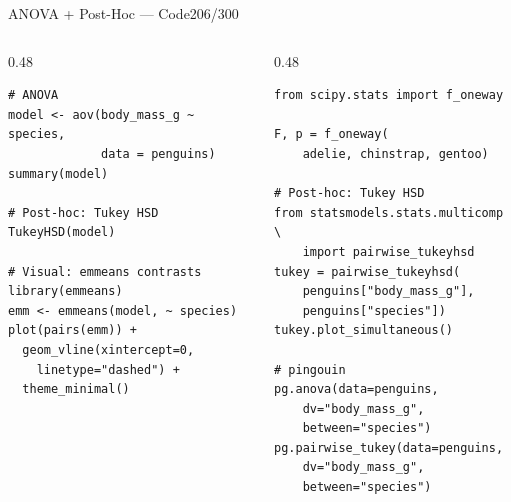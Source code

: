 \documentclass[10pt]{beamer}
\newcommand{\smark}[1]{\hfill{\scriptsize\color{codegray}#1}}
\begin{document}
\begin{frame}[fragile]{ANOVA + Post-Hoc --- Code}\smark{206/300}
\begin{columns}[T]
\begin{column}{0.48\textwidth}
\begin{lstlisting}[style=Rstyle]
# ANOVA
model <- aov(body_mass_g ~ species,
             data = penguins)
summary(model)

# Post-hoc: Tukey HSD
TukeyHSD(model)

# Visual: emmeans contrasts
library(emmeans)
emm <- emmeans(model, ~ species)
plot(pairs(emm)) +
  geom_vline(xintercept=0,
    linetype="dashed") +
  theme_minimal()
\end{lstlisting}
\end{column}
\begin{column}{0.48\textwidth}
\begin{lstlisting}[style=Pystyle]
from scipy.stats import f_oneway

F, p = f_oneway(
    adelie, chinstrap, gentoo)

# Post-hoc: Tukey HSD
from statsmodels.stats.multicomp \
    import pairwise_tukeyhsd
tukey = pairwise_tukeyhsd(
    penguins["body_mass_g"],
    penguins["species"])
tukey.plot_simultaneous()

# pingouin
pg.anova(data=penguins,
    dv="body_mass_g",
    between="species")
pg.pairwise_tukey(data=penguins,
    dv="body_mass_g",
    between="species")
\end{lstlisting}
\end{column}
\end{columns}
\end{frame}
\end{document}
